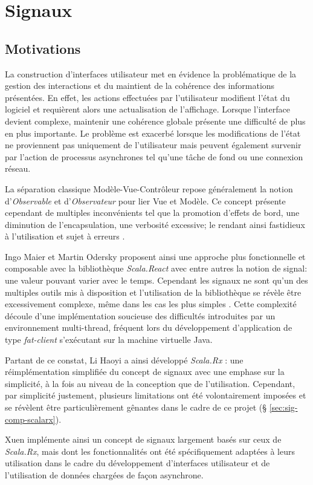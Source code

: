 \chapter{Signaux}

\section{Motivations}

La construction d'interfaces utilisateur met en évidence la problématique de la gestion des interactions et du maintient de la cohérence des informations présentées. En effet, les actions effectuées par l'utilisateur modifient l'état du logiciel et requièrent alors une actualisation de l'affichage. Lorsque l'interface devient complexe, maintenir une cohérence globale présente une difficulté de plus en plus importante. Le problème est exacerbé lorsque les modifications de l'état ne proviennent pas uniquement de l'utilisateur mais peuvent également survenir par l'action de processus asynchrones tel qu'une tâche de fond ou une connexion réseau.

La séparation classique Modèle-Vue-Contrôleur repose généralement la notion d'\emph{Observable} et d'\emph{Observateur} pour lier Vue et Modèle. Ce concept présente cependant de multiples inconvénients tel que la promotion d'effets de bord, une diminution de l'encapsulation, une verbosité excessive; le rendant ainsi fastidieux à l'utilisation et sujet à erreurs \cite{odersky2012}.

Ingo Maier et Martin Odersky proposent ainsi une approche plus fonctionnelle et composable avec la bibliothèque \emph{Scala.React} \cite{scala-react} avec entre autres la notion de signal: une valeur pouvant varier avec le temps. Cependant les signaux ne sont qu'un des multiples outils mis à disposition et l'utilisation de la bibliothèque se révèle être excessivement complexe, même dans les cas les plus simples \cite[\small Related~Work]{scala.rx}. Cette complexité découle d'une implémentation soucieuse des difficultés introduites par un environnement multi-thread, fréquent lors du développement d'application de type \emph{fat-client} s'exécutant sur la machine virtuelle Java.

Partant de ce constat, Li Haoyi a ainsi développé \emph{Scala.Rx} \cite{scala.rx}: une réimplémentation simplifiée du concept de signaux avec une emphase sur la simplicité, à la fois au niveau de la conception que de l'utilisation. Cependant, par simplicité justement, plusieurs limitations ont été volontairement imposées et se révèlent être particulièrement gênantes dans le cadre de ce projet (§ \ref{sec:sig-comp-scalarx}).

Xuen implémente ainsi un concept de signaux largement basés sur ceux de \emph{Scala.Rx}, mais dont les fonctionnalités ont été spécifiquement adaptées à leurs utilisation dans le cadre du développement d'interfaces utilisateur et de l'utilisation de données chargées de façon asynchrone.






